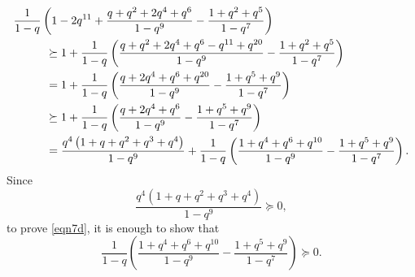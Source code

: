 \documentclass[12pt,reqno]{amsart}
\renewcommand{\(}{\left\(}
\renewcommand{\)}{\right\)}
\numberwithin{equation}{section}
\theoremstyle{plain}
\theoremstyle{definition}
\numberwithin{equation}{section}
\begin{document}
\begin{align*}
&\frac{1}{1-q} \left(1-2q^{11} +\frac{q + q^2 + 2 q^4+q^6}{1-q^9}-\frac{1+ q^2+q^5}{1-q^7} \right)\\
&\hspace{1 cm}\succeq 1+\frac{1}{1-q}\left(\frac{q + q^2 + 2 q^4+q^6-q^{11}+q^{20}}{1-q^9}-\frac{1+ q^2+q^5}{1-q^7}\right)\\
&\hspace{1 cm}=1+\frac{1}{1-q}\left(\frac{q + 2 q^4+q^6+q^{20}}{1-q^9}-\frac{1 + q^5 + q^{9}}{1-q^7}\right)\\
&\hspace{1 cm}\succeq 1+\frac{1}{1-q}\left(\frac{q + 2 q^4+q^6}{1-q^9}-\frac{1 + q^5 + q^{9}}{1-q^7}\right)\\
&\hspace{1 cm}=\frac{q^4\left(1+q+q^2+q^3+q^4\right)}{1-q^9}+\frac{1}{1-q}\left(\frac{1 + q^4+q^6+q^{10}}{1-q^9}-\frac{1 + q^5 + q^{9}}{1-q^7}\right).
\end{align*}
Since
\[
\frac{q^4\left(1+q+q^2+q^3+q^4\right)}{1-q^9}\succeq 0,
\]
to prove \eqref{eqn7d}, it is enough to show that
\begin{equation*}%
\frac{1}{1-q}\left(\frac{1 + q^4+q^6+q^{10}}{1-q^9}-\frac{1 + q^5 + q^{9}}{1-q^7}\right)\succeq 0.
\end{equation*}

\end{document}
